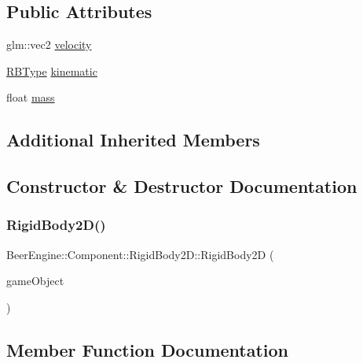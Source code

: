 \subsection*{Public Attributes}
\begin{DoxyCompactItemize}
\item 
glm\+::vec2 \mbox{\hyperlink{class_beer_engine_1_1_component_1_1_rigid_body2_d_a485653f0ef04660b094871be32a6b0a7}{velocity}}
\item 
\mbox{\hyperlink{namespace_beer_engine_1_1_component_a2cfe279cc309b6420e792597940b8a33}{R\+B\+Type}} \mbox{\hyperlink{class_beer_engine_1_1_component_1_1_rigid_body2_d_a38906d52d817c362f4c9e226e21bf29f}{kinematic}}
\item 
float \mbox{\hyperlink{class_beer_engine_1_1_component_1_1_rigid_body2_d_a65249c4a9bb801725bfb4235e8d0f244}{mass}}
\end{DoxyCompactItemize}
\subsection*{Additional Inherited Members}


\subsection{Constructor \& Destructor Documentation}
\mbox{\label{class_beer_engine_1_1_component_1_1_rigid_body2_d_a5f0d9faa4cd26f4628f9af1601868e3d}} 
\subsubsection{\texorpdfstring{Rigid\+Body2\+D()}{RigidBody2D()}}
{\footnotesize\ttfamily Beer\+Engine\+::\+Component\+::\+Rigid\+Body2\+D\+::\+Rigid\+Body2D (\begin{DoxyParamCaption}\item[{\mbox{\hyperlink{class_beer_engine_1_1_game_object}{Game\+Object}} $\ast$}]{game\+Object }\end{DoxyParamCaption})}



\subsection{Member Function Documentation}
\mbox{\label{class_beer_engine_1_1_component_1_1_rigid_body2_d_ae070289cdf3c6fde105671d41ee8315a}} 

